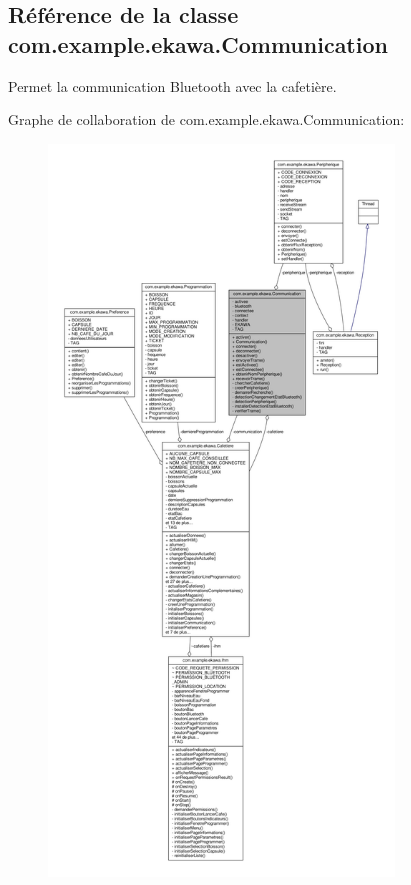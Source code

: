 \hypertarget{classcom_1_1example_1_1ekawa_1_1_communication}{}\subsection{Référence de la classe com.\+example.\+ekawa.\+Communication}
\label{classcom_1_1example_1_1ekawa_1_1_communication}


Permet la communication Bluetooth avec la cafetière.  




Graphe de collaboration de com.\+example.\+ekawa.\+Communication\+:\nopagebreak
\begin{figure}[H]
\begin{center}
\leavevmode
\includegraphics[height=550pt]{classcom_1_1example_1_1ekawa_1_1_communication__coll__graph}
\end{center}
\end{figure}
